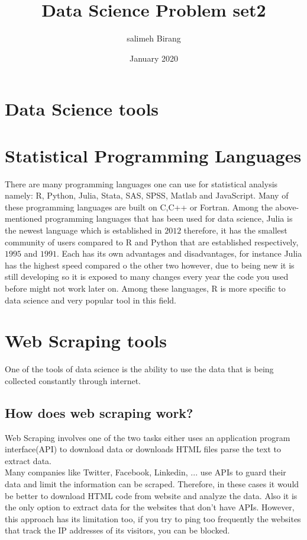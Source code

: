 \documentclass{article}
\title{Data Science Problem set2}
\author{salimeh Birang }
\date{January 2020}
\begin{document}
\maketitle

\section*{Data Science tools}
\section{Statistical Programming Languages}
There are many programming languages one can use for statistical analysis namely: R, Python, Julia, Stata, SAS, SPSS, Matlab and JavaScript. Many of these programming languages are built on C,C++ or Fortran. Among the above-mentioned programming languages that has been used for data science, Julia is the newest language which is established in $2012$ therefore, it has the smallest community of users compared to R and Python that are established respectively, $1995$ and $1991$. Each has its own advantages and disadvantages, for instance Julia has the highest speed compared o the other two however, due to being new it is still developing so it is exposed to many changes every year the code you used before might not work later on. Among these languages, R is more specific to data science and very popular tool in this field.  \\
\section{Web Scraping tools}
One of the tools of data science is the ability to use the data that is being collected constantly through internet. 
\subsection{How does web scraping work?}
Web Scraping involves one of the two tasks either uses an application program interface(API) to download data or downloads HTML files parse the text to extract data.\\
Many companies like Twitter, Facebook, Linkedin, ... use APIs to guard their data and limit the information can be scraped. Therefore, in these cases it would be better to download HTML code from website and analyze the data. Also it is the only option to extract data for the websites that don't have APIs. However, this approach has its limitation too, if you try to ping too frequently the websites that track the IP addresses of its visitors, you can be blocked.\\
\end{document}
